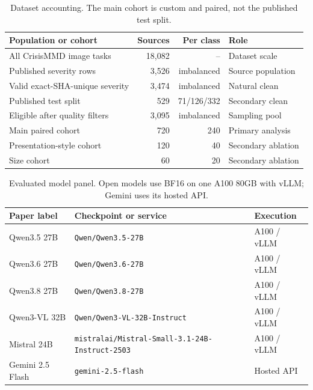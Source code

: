\begin{table}[!htbp]
  \caption{Dataset accounting. The main cohort is custom and paired, not the published test split.}
  \label{tab:dataset}
  \centering
  \small
  \begin{tabular}{lrrl}
    \toprule
    Population or cohort & Sources & Per class & Role \\
    \midrule
    All CrisisMMD image tasks & 18,082 & -- & Dataset scale \\
    Published severity rows & 3,526 & imbalanced & Source population \\
    Valid exact-SHA-unique severity & 3,474 & imbalanced & Natural clean \\
    Published test split & 529 & 71/126/332 & Secondary clean \\
    Eligible after quality filters & 3,095 & imbalanced & Sampling pool \\
    Main paired cohort & 720 & 240 & Primary analysis \\
    Presentation-style cohort & 120 & 40 & Secondary ablation \\
    Size cohort & 60 & 20 & Secondary ablation \\
    \bottomrule
  \end{tabular}
\end{table}

\begin{table}[!htbp]
  \caption{Evaluated model panel. Open models use BF16 on one A100 80GB with vLLM; Gemini uses its hosted API.}
  \label{tab:models}
  \centering
  \scriptsize
  \begin{tabularx}{\textwidth}{@{}l>{\raggedright\arraybackslash}Xl@{}}
    \toprule
    Paper label & Checkpoint or service & Execution \\
    \midrule
    Qwen3.5 27B & \nolinkurl{Qwen/Qwen3.5-27B} \citep{qwen35modelcard} & A100 / vLLM \\
    Qwen3.6 27B & \nolinkurl{Qwen/Qwen3.6-27B} \citep{qwen36modelcard} & A100 / vLLM \\
    Qwen3.8 27B & \nolinkurl{Qwen/Qwen3.8-27B} \citep{qwen38modelcard} & A100 / vLLM \\
    Qwen3-VL 32B & \nolinkurl{Qwen/Qwen3-VL-32B-Instruct} \citep{qwen3vlmodelcard} & A100 / vLLM \\
    Mistral 24B & \nolinkurl{mistralai/Mistral-Small-3.1-24B-Instruct-2503} \citep{mistral31modelcard} & A100 / vLLM \\
    Gemini 2.5 Flash & \nolinkurl{gemini-2.5-flash} \citep{gemini25flash} & Hosted API \\
    \bottomrule
  \end{tabularx}
\end{table}

